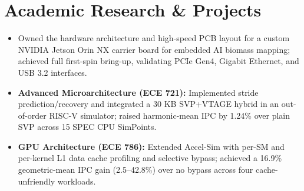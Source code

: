 \section*{Academic Research \& Projects}

\begin{itemize}
  \item Owned the hardware architecture and high-speed PCB layout for a custom NVIDIA Jetson Orin NX carrier board for embedded AI biomass mapping; achieved full first-spin bring-up, validating PCIe Gen4, Gigabit Ethernet, and USB 3.2 interfaces.
\end{itemize}
\begin{itemize}
  \item \textbf{Advanced Microarchitecture (ECE 721):} Implemented stride prediction/recovery and integrated a 30 KB SVP+VTAGE hybrid in an out-of-order RISC-V simulator; raised harmonic-mean IPC by 1.24\% over plain SVP across 15 SPEC CPU SimPoints.
  \item \textbf{GPU Architecture (ECE 786):} Extended Accel-Sim with per-SM and per-kernel L1 data cache profiling and selective bypass; achieved a 16.9\% geometric-mean IPC gain (2.5--42.8\%) over no bypass across four cache-unfriendly workloads.
\end{itemize}
